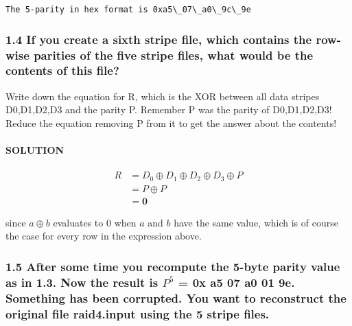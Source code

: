 \documentclass[11pt]{article}
\begin{document}
    \begin{Verbatim}[commandchars=\\\{\}]
The 5-parity in hex format is 0xa5\_07\_a0\_9c\_9e
    \end{Verbatim}

    \hypertarget{if-you-create-a-sixth-stripe-file-which-contains-the-row-wise-parities-of-the-five-stripe-files-what-would-be-the-contents-of-this-file}{%
\subsubsection{1.4 If you create a sixth stripe file, which contains the
row-wise parities of the five stripe files, what would be the contents
of this
file?}\label{if-you-create-a-sixth-stripe-file-which-contains-the-row-wise-parities-of-the-five-stripe-files-what-would-be-the-contents-of-this-file}}

    Write down the equation for R, which is the XOR between all data stripes
D0,D1,D2,D3 and the parity P. Remember P was the parity of D0,D1,D2,D3!
Reduce the equation removing P from it to get the answer about the
contents!

    \hypertarget{solution}{%
\paragraph{SOLUTION}\label{solution}}

\begin{align*}
R &= D_0\oplus D_1\oplus D_2\oplus D_3\oplus P\\
&= P\oplus P\\
&= \mathbf{0}
\end{align*}

since \(a\oplus b\) evaluates to \(0\) when \(a\) and \(b\) have the
same value, which is of course the case for every row in the expression
above.

    \hypertarget{after-some-time-you-recompute-the-5-byte-parity-value-as-in-1.3.-now-the-result-is-p5-0x-a5-07-a0-01-9e.-something-has-been-corrupted.-you-want-to-reconstruct-the-original-file-raid4.input-using-the-5-stripe-files.}{%
\subsubsection{\texorpdfstring{1.5 After some time you recompute the
5-byte parity value as in 1.3. Now the result is \(P^5\) = 0x a5 07 a0
01 9e. Something has been corrupted. You want to reconstruct the
original file raid4.input using the 5 stripe
files.}{1.5 After some time you recompute the 5-byte parity value as in 1.3. Now the result is P\^{}5 = 0x a5 07 a0 01 9e. Something has been corrupted. You want to reconstruct the original file raid4.input using the 5 stripe files.}}\label{after-some-time-you-recompute-the-5-byte-parity-value-as-in-1.3.-now-the-result-is-p5-0x-a5-07-a0-01-9e.-something-has-been-corrupted.-you-want-to-reconstruct-the-original-file-raid4.input-using-the-5-stripe-files.}}
\end{document}
